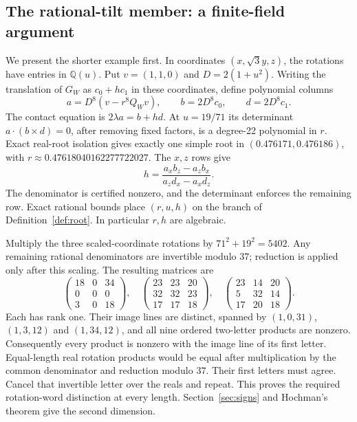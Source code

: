 \documentclass[11pt,a4paper]{article}
\theoremstyle{definition}\newtheorem{definition}[theorem]{Definition}
\theoremstyle{remark}\newtheorem{remark}[theorem]{Remark}
\begin{document}
\subsection{The rational-tilt member: a finite-field argument}
We present the shorter example first. In coordinates $(x,\sqrt3y,z)$, the
rotations have entries in $\mathbb Q(u)$. Put $v=(1,1,0)$ and
$D=2(1+u^2)$. Writing the translation of $G_W$ as $c_0+hc_1$ in these
coordinates, define polynomial columns
\[
a=D^8(v-r^8Q_Wv),\qquad b=2D^8c_0,\qquad d=2D^8c_1.
\]
The contact equation is $2\lambda a=b+hd$. At $u=19/71$ its determinant
$a\cdot(b\times d)=0$, after removing fixed factors, is a degree-22
polynomial in $r$. Exact real-root isolation gives exactly one simple root
in $(0.476171,0.476186)$, with
$r\approx0.47618040162277722027$. The $x,z$ rows give
\[
h=\frac{a_xb_z-a_zb_x}{a_zd_x-a_xd_z}.
\]
The denominator is certified nonzero, and the determinant enforces the
remaining row.
Exact rational bounds place $(r,u,h)$ on the branch of
Definition~\ref{def:root}. In particular $r,h$ are algebraic.

Multiply the three scaled-coordinate rotations by $71^2+19^2=5402$.
Any remaining rational denominators are invertible modulo $37$; reduction
is applied only after this scaling. The resulting matrices are
\[
\begin{pmatrix}18&0&34\\0&0&0\\3&0&18\end{pmatrix},\quad
\begin{pmatrix}23&23&20\\32&32&23\\17&17&18\end{pmatrix},\quad
\begin{pmatrix}23&14&20\\5&32&14\\17&20&18\end{pmatrix}.
\]
Each has rank one. Their image lines are distinct, spanned by
$(1,0,31)$, $(1,3,12)$ and $(1,34,12)$, and all nine ordered two-letter
products are nonzero. Consequently every product is nonzero with the image
line of its first letter. Equal-length real rotation products would be equal
after multiplication by the common denominator and reduction modulo $37$.
Their first letters must agree. Cancel that invertible letter over the reals
and repeat. This proves the required rotation-word distinction at every length.
Section~\ref{sec:signs} and Hochman's theorem give the second dimension.
\end{document}
